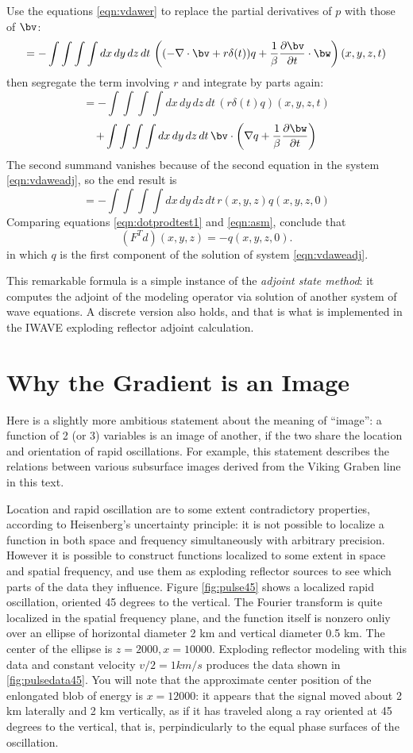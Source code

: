 Use the equations \ref{eqn:vdawer} to replace the partial derivatives of $p$ with those of $\bv$:
\[
= -\int \int \int \int dx\,dy\,dz\,dt\, \left((-\nabla \cdot \bv + r\delta(t))q+
\frac{1}{\beta}\frac{\partial \bv}{\partial t} \cdot \bw  \right) (x,y,z,t) 
\]
then segregate the term involving $r$ and integrate by parts again:
\[
= - \int \int \int \int dx\,dy\,dz\,dt\, (r\delta(t) q) (x,y,z,t) 
\]
\[
+\int \int \int \int dx\,dy\,dz\,dt\, \bv \cdot \left(\nabla q + \frac{1}{\beta}\frac{\partial \bw}{\partial t}\right)
\]
The second summand vanishes because of the second equation in the system \ref{eqn:vdaweadj}, so the end result is
\begin{equation}
\label{eqn:asm}
= - \int \int \int \int dx\,dy\,dz\,dt\, r(x,y,z) q(x,y,z,0)
\end{equation}
Comparing equations \ref{eqn:dotprodtest1} and \ref{eqn:asm}, conclude that
\begin{equation}
\label{eqn:adjer}
(F^Td)(x,y,z)=-q(x,y,z,0).
\end{equation}
in which $q$ is the first component of the solution of system \ref{eqn:vdaweadj}.

This remarkable formula is a simple instance of the {\em adjoint state method}: it computes the adjoint of the modeling operator via solution of another system of wave equations. A discrete version also holds, and that is what is implemented in the IWAVE exploding reflector adjoint calculation. 

\section{Why the Gradient is an Image}
Here is a slightly more ambitious statement about the meaning of ``image'': a function of 2 (or 3) variables is an image of another, if the two share the location and orientation of rapid oscillations. For example, this statement describes the relations between various subsurface images derived from the Viking Graben line in this text.

Location and rapid oscillation are to some extent contradictory properties, according to Heisenberg's uncertainty principle: it is not possible to localize a function in both space and frequency simultaneously  with arbitrary precision. However it is possible to construct functions localized to some extent in space and spatial frequency, and use them as exploding reflector sources to see which parts of the data they influence. Figure \ref{fig:pulse45} shows a localized rapid oscillation, oriented 45 degrees to the vertical. The Fourier transform is quite localized in the spatial frequency plane, and the function itself is nonzero onliy over an ellipse of horizontal diameter 2 km and vertical diameter 0.5 km. The center of the ellipse is $z=2000, x=10000$. Exploding reflector modeling with this data and constant velocity $v/2 = 1 km/s$ produces the data shown in \ref{fig:pulsedata45}. You will note that the approximate center position of the enlongated blob of energy is $x=12000$: it appears that the signal moved about 2 km laterally and 2 km vertically, as if it has traveled along a ray oriented at 45 degrees to the vertical, that is, perpindicularly to the equal phase surfaces of the oscillation.

